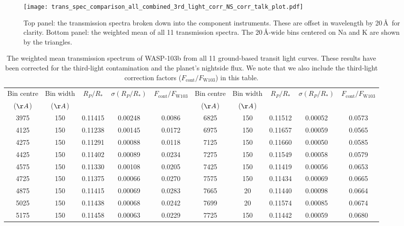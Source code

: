 \documentclass[twocolumn]{aastex63}
\begin{document}
\begin{figure*}
    \centering
    \texttt{[image: trans\_spec\_comparison\_all\_combined\_3rd\_light\_corr\_NS\_corr\_talk\_plot.pdf]}
    \caption{Top panel: the transmission spectra broken down into the component instruments. These are offset in wavelength by 20\,\AA\ for clarity. Bottom panel: the weighted mean of all 11 transmission spectra. The 20\,\AA-wide bins centered on Na and K are shown by the triangles.}
    \label{fig:transmission_spectrum}
\end{figure*}

\begin{table*}
\centering
\caption{The weighted mean transmission spectrum of WASP-103b from all 11 ground-based transit light curves. These results have been corrected for the third-light contamination and the planet's nightside flux. We note that we also include the third-light correction factors ($F_\mathrm{cont}/F_\mathrm{W103}$) in this table.}
\label{tab:transmission_spectrum}
\begin{tabular}{ccccc|ccccc}
\toprule
  Bin centre &  Bin width & $R_P/R_*$ & $\sigma(R_P/R_*)$ & $F_\mathrm{cont}/F_\mathrm{W103}$ & Bin centre &  Bin width & $R_P/R_*$ & $\sigma(R_P/R_*)$ & $F_\mathrm{cont}/F_\mathrm{W103}$ \\
  ($\AA$) & ($\AA$) & & & & ($\AA$) & ($\AA$) & & & \\ \hline
\midrule
 3975 &    150 &  0.11415 &  0.00248  & 0.0086  & 6825 &    150 &  0.11512 &  0.00052 & 0.0573  \\
 4125 &    150 &  0.11238 &  0.00145  & 0.0172 & 6975 &    150 &  0.11657 &  0.00059  & 0.0565 \\
 4275 &    150 &  0.11291 &  0.00088  & 0.0118 & 7125 &    150 &  0.11660 &  0.00050  & 0.0585 \\
 4425 &    150 &  0.11402 &  0.00089  & 0.0234 & 7275 &    150 &  0.11549 &  0.00058  & 0.0579 \\
 4575 &    150 &  0.11330 &  0.00108  & 0.0205 & 7425 &    150 &  0.11419 &  0.00056  & 0.0653 \\
 4725 &    150 &  0.11375 &  0.00066  & 0.0270 & 7575 &    150 &  0.11434 &  0.00069  & 0.0665 \\
 4875 &    150 &  0.11415 &  0.00069  & 0.0283 & 7665 &     20 &  0.11440 &  0.00098  & 0.0664 \\
 5025 &    150 &  0.11438 &  0.00068  & 0.0242 & 7699 &     20 &  0.11574 &  0.00085 & 0.0674 \\
 5175 &    150 &  0.11458 &  0.00063  & 0.0229 & 7725 &    150 &  0.11442 &  0.00059  & 0.0680 \\

\end{tabular}
\end{table*}
\end{document}
